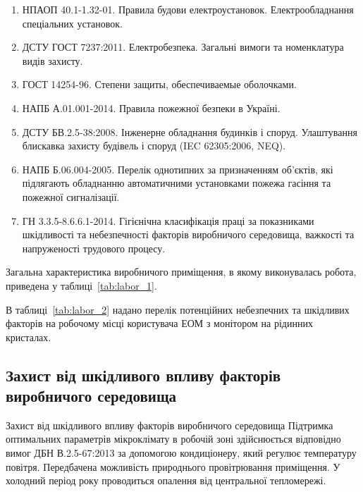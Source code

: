 \begin{enumerate}
	\item НПАОП 40.1-1.32-01. Правила будови електроустановок. Електрообладнання спеціальних установок.
	\item ДСТУ ГОСТ 7237:2011. Електробезпека. Загальні вимоги та номенклатура видів захисту.
	\item ГОСТ 14254-96. Степени защиты, обеспечиваемые оболочками.
	\item НАПБ А.01.001-2014. Правила пожежної безпеки в Україні.
	\item ДСТУ БВ.2.5-38:2008. Інженерне обладнання будинків і споруд. Улаштування блискавка захисту будівель і споруд (IEC 62305:2006, NEQ).
	\item НАПБ Б.06.004-2005. Перелік однотипних за призначенням об’єктів, які підлягають обладнанню автоматичними установками пожежа гасіння та пожежної сигналізації.
	\item ГН 3.3.5-8.6.6.1-2014. Гігієнічна класифікація праці за показниками шкідливості та небезпечності факторів виробничого середовища, важкості та напруженості трудового процесу.
\end{enumerate}

Загальна характеристика виробничого приміщення, в якому виконувалась робота, приведена у таблиці~\ref{tab:labor_1}.

В таблиці~\ref{tab:labor_2} надано перелік потенційних небезпечних та шкідливих факторів на робочому місці користувача ЕОМ з монітором на рідинних кристалах.

\subsection{Захист від шкідливого впливу факторів виробничого середовища}
Захист від шкідливого впливу факторів виробничого середовища
Підтримка оптимальних параметрів мікроклімату в робочій зоні здійснюється відповідно вимог ДБН В.2.5-67:2013 за допомогою кондиціонеру, який регулює температуру повітря. Передбачена можливість природнього провітрювання приміщення. У холодний період року проводиться опалення від центральної тепломережі.%

